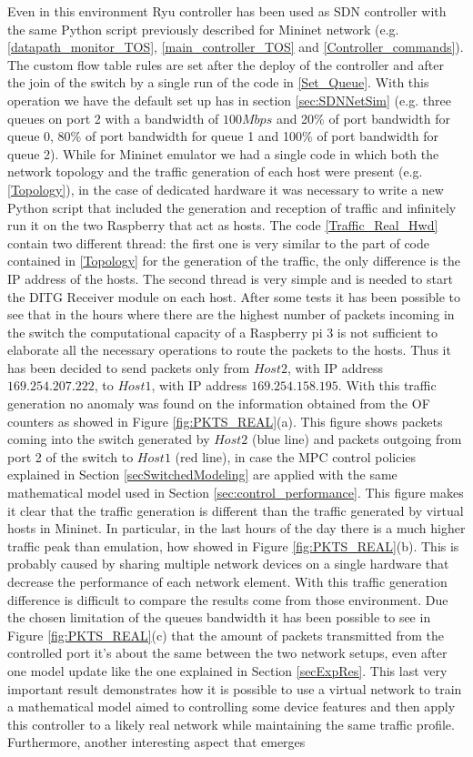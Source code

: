 Even in this environment Ryu controller has been used as SDN controller with the same Python script previously described for Mininet network (e.g. \ref{datapath_monitor_TOS}, \ref{main_controller_TOS} and \ref{Controller_commands}). The custom flow table rules are set after the deploy of the controller and after the join of the switch by a single run of the code in \ref{Set_Queue}. With this operation we have the default set up has in section \ref{sec:SDNNetSim} (e.g. three queues on port 2 with a bandwidth of $100Mbps$ and 20\% of port bandwidth for queue 0, 80\% of port bandwidth for queue 1 and 100\% of port bandwidth for queue 2). While for Mininet emulator we had a single code in which both the network topology and the traffic generation of each host were present (e.g. \ref{Topology}), in the case of dedicated hardware it was necessary to write a new Python script that included the generation and reception of traffic and infinitely run it on the two Raspberry that act as hosts. The code \ref{Traffic_Real_Hwd} contain two different thread: the first one is very similar to the part of code contained in \ref{Topology} for the generation of the traffic, the only difference is the IP address of the hosts. The second thread is very simple and is needed to start the DITG Receiver module on each host. After some tests it has been possible to see that in the hours where there are the highest number of packets incoming in the switch the computational capacity of a Raspberry pi 3 is not sufficient to elaborate all the necessary operations to route the packets to the hosts. Thus it has been decided to send packets only from $Host 2$, with IP address $169.254.207.222$, to $Host 1$, with IP address $169.254.158.195$. With this traffic generation no anomaly was found on the information obtained from the OF counters as showed in Figure \ref{fig:PKTS_REAL}(a). This figure shows packets coming into the switch generated by $Host 2$ (blue line) and packets outgoing from port 2 of the switch to $Host 1$ (red line), in case the MPC control policies explained in Section \ref{secSwitchedModeling} are applied with the same mathematical model used in Section \ref{sec:control_performance}. This figure makes it clear that the traffic generation is different than the traffic generated by virtual hosts in Mininet. In particular, in the last hours of the day there is a much higher traffic peak than emulation, how showed in Figure \ref{fig:PKTS_REAL}(b). This is probably caused by sharing multiple network devices on a single hardware that decrease the performance of each network element. With this traffic generation difference is difficult to compare the results come from those environment. Due the chosen limitation of the queues bandwidth it has been possible to see in Figure \ref{fig:PKTS_REAL}(c) that the amount of packets transmitted from the controlled port it's about the same between the two network setups, even after one model update like the one explained in Section \ref{secExpRes}. This last very important result demonstrates how it is possible to use a virtual network to train a mathematical model aimed to controlling some device features and then apply this controller to a likely real network while maintaining the same traffic profile. Furthermore, another interesting aspect that emerges 